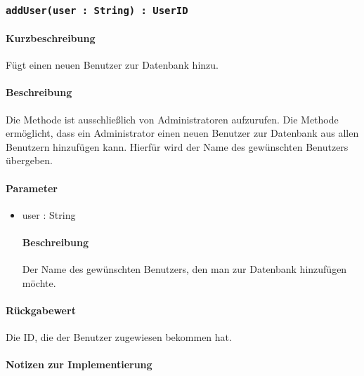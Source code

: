 \subsubsection{\texttt{addUser(user : String) : UserID}}%
\paragraph*{Kurzbeschreibung}
Fügt einen neuen Benutzer zur Datenbank hinzu.
\paragraph*{Beschreibung}
Die Methode ist ausschließlich von Administratoren aufzurufen.
Die Methode ermöglicht, dass ein Administrator einen neuen Benutzer zur Datenbank aus allen Benutzern hinzufügen kann.
Hierfür wird der Name des gewünschten Benutzers übergeben.
\paragraph*{Parameter}
\begin{itemize}
    \item user : String
    		\paragraph*{Beschreibung}
    		Der Name des gewünschten Benutzers, den man zur Datenbank hinzufügen möchte.
\end{itemize}
\paragraph*{Rückgabewert}
Die ID, die der Benutzer zugewiesen bekommen hat.

\paragraph*{Notizen zur Implementierung}%
